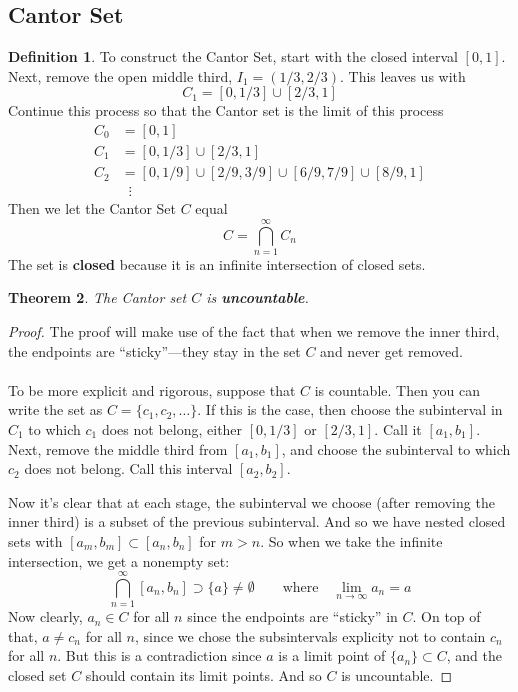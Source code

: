 \documentclass[12pt]{article}
\theoremstyle{plain}
\newtheorem{thm}{Theorem}[subsection]
\theoremstyle{definition}
\newtheorem{defn}[thm]{Definition}
\theoremstyle{remark}
\begin{document}
\subsection{Cantor Set\label{CantorSet}}

\begin{defn}
To construct the Cantor Set, start with the closed interval $[0,1]$. Next, remove the open middle third, $I_1 = (1/3, 2/3)$. This leaves us with 
    \[ C_1 = [0, 1/3] \cup [2/3, 1] \]
Continue this process so that the Cantor set is the limit of this process
\begin{align*}
    C_0 &= [0,1] \\
    C_1 &= [0,1/3] \cup [2/3, 1] \\
    C_2 &= [0,1/9] \cup [2/9, 3/9]  \cup [6/9, 7/9] \cup [8/9, 1]
        \\
    &\;\;\vdots 
\end{align*}
Then we let the Cantor Set $C$ equal
    \[ C = \bigcap^\infty_{n=1} C_n \]
    The set is \textbf{closed} because it is an infinite intersection of closed sets.
\end{defn}

\begin{thm}
The Cantor set $C$ is \textbf{uncountable}. 
\end{thm}
\begin{proof}
The proof will make use of the fact that when we remove the inner third, the endpoints are ``sticky''---they stay in the set $C$ and never get removed.
\\
\\
To be more explicit and rigorous, suppose that $C$ is countable. Then you can write the set as $C = \{c_1, c_2, \ldots\}$. If this is the case, then choose the subinterval in $C_1$ to which $c_1$ does not belong, either $[0,1/3]$ or $[2/3,1]$. Call it $[a_1, b_1]$. Next, remove the middle third from $[a_1, b_1]$, and choose the subinterval to which $c_2$ does not belong. Call this interval $[a_2, b_2]$. 

Now it's clear that at each stage, the subinterval we choose (after removing the inner third) is a subset of the previous subinterval. And so we have nested closed sets with $[a_m, b_m] \subset [a_n, b_n]$ for $m>n$. So when we take the infinite intersection, we get a nonempty set:
\[ 
    \bigcap^\infty_{n=1} [a_n, b_n] \supset \{a\} \neq 
    \emptyset\qquad \text{where} \quad 
    \lim_{n\rightarrow\infty} a_n = a
\]
Now clearly, $a_n\in C$ for all $n$ since the endpoints are ``sticky'' in $C$.  On top of that, $a\neq c_n$ for all $n$, since we chose the subsintervals explicity not to contain $c_n$ for all $n$.  But this is a contradiction since $a$ is a limit point of $\{a_n\}\subset C$, and the closed set $C$ should contain its limit points. And so $C$ is uncountable.
\end{proof}
\end{document}
